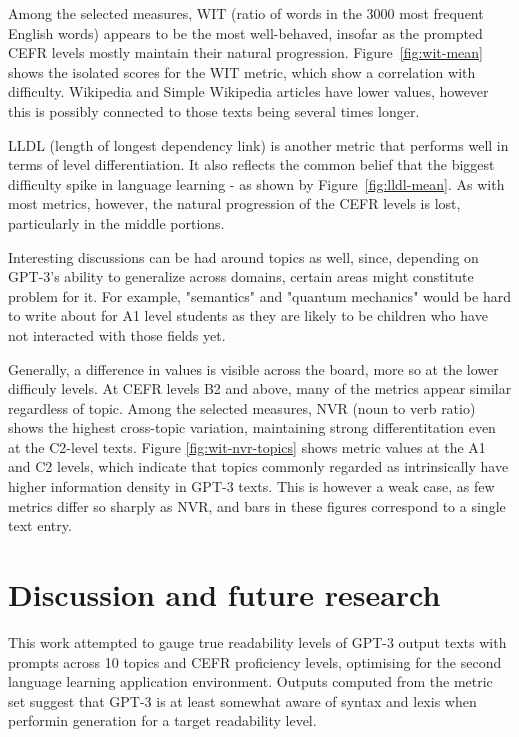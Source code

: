 \documentclass[11pt]{article}
\begin{document}
Among the selected measures, WIT (ratio of words in the 3000 most frequent English words) appears to be the most well-behaved, insofar as the prompted CEFR levels mostly maintain their natural progression. Figure~\ref{fig:wit-mean} shows the isolated scores for the WIT metric, which show a correlation with difficulty. Wikipedia and Simple Wikipedia articles have lower values, however this is possibly connected to those texts being several times longer.



LLDL (length of longest dependency link) is another metric that performs well in terms of level differentiation. It also reflects the common belief that the biggest difficulty spike in language learning - as shown by Figure~\ref{fig:lldl-mean}. As with most metrics, however, the natural progression of the CEFR levels is lost, particularly in the middle portions.

Interesting discussions can be had around topics as well, since, depending on GPT-3's ability to generalize across domains, certain areas might constitute problem for it. For example, "semantics" and "quantum mechanics" would be hard to write about for A1 level students as they are likely to be children who have not interacted with those fields yet.

Generally, a difference in values is visible across the board, more so at the lower difficuly levels. At CEFR levels B2 and above, many of the metrics appear similar regardless of topic. Among the selected measures, NVR (noun to verb ratio) shows the highest cross-topic variation, maintaining strong differentitation even at the C2-level texts. Figure \ref{fig:wit-nvr-topics} shows metric values at the A1 and C2 levels, which indicate that topics commonly regarded as intrinsically have higher information density in GPT-3 texts. This is however a weak case, as few metrics differ so sharply as NVR, and bars in these figures correspond to a single text entry.



\section{Discussion and future research}

This work attempted to gauge true readability levels of GPT-3 output texts with prompts across 10 topics and CEFR proficiency levels, optimising for the second language learning application environment. Outputs computed from the metric set suggest that GPT-3 is at least somewhat aware of syntax and lexis when performin generation for a target readability level.
\end{document}
